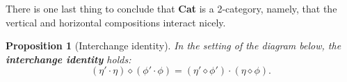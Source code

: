\documentclass{article}
\newtheorem{prop}[thm]{Proposition}
\theoremstyle{definition}
\theoremstyle{remark}
\begin{document}
There is one last thing to conclude that \textbf{Cat} is a 2-category, namely, that the vertical and horizontal compositions interact nicely.
\begin{prop}[Interchange identity]
	In the setting of the diagram below, the \textbf{interchange identity} holds:
	\[(\eta' \cdot \eta) \diamond (\phi' \cdot \phi) = (\eta' \diamond \phi') \cdot (\eta \diamond \phi).\]
	\begin{figure}[H]
		\centering
	\end{figure}
\end{prop}
\end{document}
